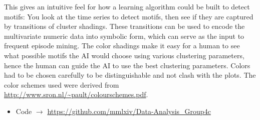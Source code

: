 This gives an intuitive feel for how a learning algorithm could be built to detect motifs:
You look at the time series to detect motifs, then see if they are captured by transitions of cluster shadings.
These transitions can be used to encode the multivariate numeric data into symbolic form, which can serve as the input to frequent episode mining.
The color shadings make it easy for a human to see what possible motifs the AI would choose using various clustering parameters, hence the human can guide the AI to use the best clustering parameters. 
Colors had to be chosen carefully to be distinguishable and not clash with the plots. The color schemes used were derived from \url{http://www.sron.nl/~pault/colourschemes.pdf}.


\begin{itemize}
  \item Code $\to$ \url{https://github.com/mmlxiv/Data-Analysis_Group4c}
\end{itemize}




